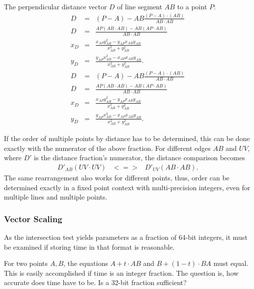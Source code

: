 \documentclass[12pt,a4paper,oneside,openany]{article}
\begin{document}

The perpendicular distance vector $D$ of line segment $AB$ to a point $P$:
\begin{eqnarray*}
D &=& (P-A) - AB\frac{(P-A) \cdot (AB)}{AB \cdot AB}  \\
D &=& \frac{AP (AB \cdot AB) - AB (AP \cdot AB)}{AB \cdot AB} \\
x_D &=& \frac{x_{AP}y^2_{AB} - y_{AP}x_{AB}y_{AB}}{x_{AB}^2+y_{AB}^2} \\
y_D &=& \frac{y_{AP}x^2_{AB} - x_{AP}x_{AB}y_{AB}}{x_{AB}^2+y_{AB}^2} .
\end{eqnarray*}
\begin{eqnarray*}
D &=& (P-A) - AB\frac{(P-A) \cdot (AB)}{AB \cdot AB}  \\
D &=& \frac{AP (AB \cdot AB) - AB (AP \cdot AB)}{AB \cdot AB} \\
x_D &=& \frac{x_{AP}y^2_{AB} - y_{AP}x_{AB}y_{AB}}{x_{AB}^2+y_{AB}^2} \\
y_D &=& \frac{y_{AP}x^2_{AB} - x_{AP}x_{AB}y_{AB}}{x_{AB}^2+y_{AB}^2} .
\end{eqnarray*}

If the order of multiple points by distance has to be determined, this can be done exactly with the numerator of the above fraction. For different edges $AB$ and $UV$, where $D'$ is the distance fraction's numerator, the distance comparison becomes
\begin{eqnarray*}
D'_{AB} (UV \cdot UV) &<=>& D'_{UV} (AB \cdot AB) .
\end{eqnarray*}
The same rearrangement also works for different points, thus, order can  be determined exactly in a fixed point context with multi-precision integers, even for multiple lines and multiple points.


\subsubsection{Vector Scaling}

As the intersection test yields parameters as a fraction of 64-bit integers, it must be examined if storing time in that format is reasonable.

For two points $A,B$, the equations $A + t \cdot AB$ and $B + (1-t) \cdot BA$ must equal. This is easily accomplished if time is an integer fraction. The question is, how accurate does time have to be. Is a 32-bit fraction sufficient?
\end{document}
